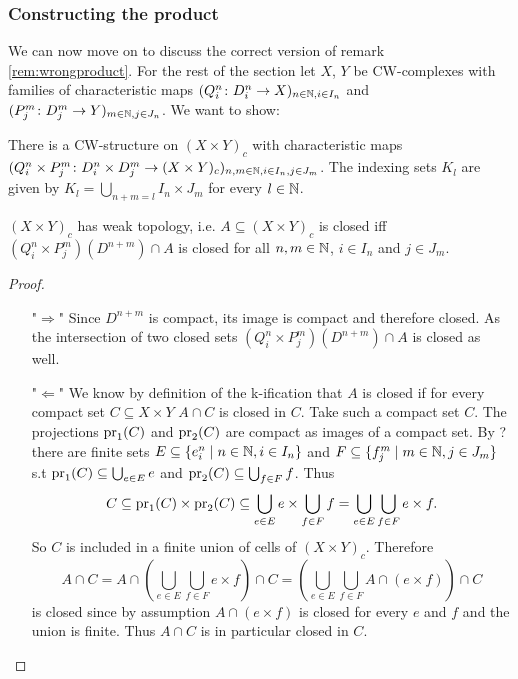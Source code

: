 \subsubsection{Constructing the product}

We can now move on to discuss the correct version of remark \ref{rem:wrongproduct}. 
For the rest of the section let $X$, $Y$ be CW-complexes with families of characteristic maps $(Q_i^n \colon D_i^n \to X)_{n \in \mathbb{N}, i \in I_n}$ and $(P_j^m \colon D_j^m \to Y)_{m \in \mathbb{N}, j \in J_n}$. 
We want to show:

\begin{lem}
    There is a CW-structure on $(X \times Y)_c$ with characteristic maps $(Q_i^n \times P_j^m \colon D_i^n \times D_j^m \to (X \times Y)_c)_{n,m \in \mathbb{N},i \in I_n,j \in J_m}$.
    The indexing sets $K_l$ are given by $K_l = \bigcup_{n + m = l}I_n \times J_m$ for every $l \in \mathbb{N}$.
\end{lem}

\begin{lem}
    $(X \times Y)_c$ has weak topology,
    i.e. $A \subseteq (X \times Y)_c$ is closed iff $(Q_i^n \times P_j^m)(D^{n + m}) \cap A$ is closed for all $n, m \in \mathbb{N}$, $i \in I_n$ and $j \in J_m$.
\end{lem}
\begin{proof}~
    \begin{enumerate}
        \item["$\Rightarrow$"] Since $D^{n + m}$ is compact, its image is compact and therefore closed. As the intersection of two closed sets $(Q_i^n \times P_j^m)(D^{n + m}) \cap A$ is closed as well.
        \item["$\Leftarrow$"] We know by definition of the k-ification that $A$ is closed if for every compact set $C \subseteq X \times Y$ $A \cap C$ is closed in $C$.
        Take such a compact set $C$.
        The projections $\text{pr}_{1}(C)$ and $\text{pr}_{2}(C)$ are compact as images of a compact set. 
        By ? there are finite sets $E \subseteq \{e_i^n \mid n \in \mathbb{N}, i \in I_n \}$ and $F \subseteq \{f_j^m \mid m \in \mathbb{N}, j \in J_m \}$ s.t $\text{pr}_{1}(C) \subseteq \bigcup_{e \in E} e$ and $\text{pr}_{2}(C) \subseteq \bigcup_{f \in F} f$.
        Thus 
        \[C \subseteq \text{pr}_{1}(C) \times \text{pr}_{2}(C) \subseteq \bigcup_{e \in E} e \times \bigcup_{f \in F} f = \bigcup_{e \in E} \bigcup_{f \in F} e \times f.\] 
        So $C$ is included in a finite union of cells of $(X \times Y)_c$. 
        Therefore 
        \[A \cap C = A \cap \left (\bigcup_{e \in E} \bigcup_{f \in F} e \times f \right )\cap C = \left (\bigcup_{e \in E} \bigcup_{f \in F} A \cap (e \times f)\right ) \cap C\] 
        is closed since by assumption $A \cap (e \times f)$ is closed for every $e$ and $f$ and the union is finite. Thus $A \cap C$ is in particular closed in $C$.
    \qedhere
    \end{enumerate}
\end{proof}
